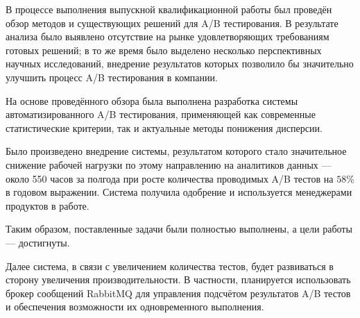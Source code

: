 \documentclass[../document.tex]{subfiles}
\begin{document}
	\par В процессе выполнения выпускной квалификационной работы был проведён обзор методов и существующих решений для A/B тестирования. В результате анализа было выявлено отсутствие на рынке удовлетворяющих требованиям готовых решений; в то же время было выделено несколько перспективных научных исследований, внедрение результатов которых позволило бы значительно улучшить процесс A/B тестирования в компании.
	\par На основе проведённого обзора была выполнена разработка системы автоматизированного A/B тестирования, применяющей как современные статистические критерии, так и актуальные методы понижения дисперсии.
	\par Было произведено внедрение системы, результатом которого стало значительное снижение рабочей нагрузки по этому направлению на аналитиков данных --- около 550 часов за полгода при росте количества проводимых A/B тестов на $58\%$ в годовом выражении. Система получила одобрение и используется менеджерами продуктов в работе.
	\par Таким образом, поставленные задачи были полностью выполнены, а цели работы --- достигнуты.
	\par Далее система, в связи с увеличением количества тестов, будет развиваться в сторону увеличения производительности. В частности, планируется использовать брокер сообщений RabbitMQ для управления подсчётом результатов A/B тестов и обеспечения возможности их одновременного выполнения.
\end{document}
